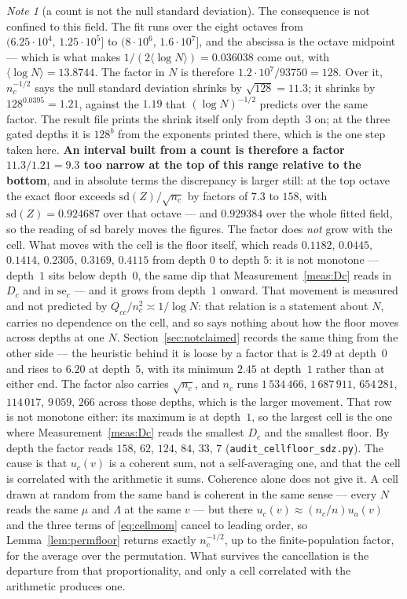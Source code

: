 \documentclass[11pt,a4paper]{article}
\theoremstyle{plain}
\theoremstyle{definition}
\theoremstyle{remark}
\newtheorem{note}[theorem]{Note}
\begin{document}
\begin{note}[a count is not the null standard deviation]\label{note:notanerrorbar}
The consequence is not confined to this field. The fit runs over the
eight octaves from $(6.25\cdot10^4,\,1.25\cdot10^5]$ to
$(8\cdot10^6,\,1.6\cdot10^7]$, and the abscissa is the octave midpoint
--- which is what makes $1/(2\langle\log N\rangle)=0.036038$ come out,
with $\langle\log N\rangle=13.8744$. The factor in $N$ is therefore
$1.2\cdot10^7/93750=128$. Over it, $n_c^{-1/2}$ says the null
standard deviation shrinks by $\sqrt{128}=11.3$; it shrinks by $128^{0.0395}=1.21$,
against the $1.19$ that $(\log N)^{-1/2}$ predicts over the same
factor. The result file prints the shrink itself only from depth~$3$
on; at the three gated depths it is $128^b$ from the exponents printed
there, which is the one step taken here. \textbf{An interval built from a count is therefore a factor
$11.3/1.21=9.3$ too narrow at the top of this range relative to the
bottom}, and in absolute terms the
discrepancy is larger still: at the top octave the exact floor exceeds
$\mathrm{sd}(Z)/\sqrt{n_c}$ by factors of $7.3$ to $158$, with
$\mathrm{sd}(Z)=0.924687$ over that octave --- and $0.929384$ over the
whole fitted field, so the reading of $\mathrm{sd}$ barely moves the
figures. The factor does \emph{not} grow with the cell. What moves with
the cell is the floor itself, which reads $0.1182$, $0.0445$, $0.1414$,
$0.2305$, $0.3169$, $0.4115$ from depth $0$ to depth $5$: it is not
monotone --- depth~$1$ sits below depth~$0$, the same dip that
Measurement~\ref{meas:Dc} reads in $D_c$ and in $\mathrm{se}_c$ --- and
it grows from depth~$1$ onward. That movement is measured and not
predicted by
$Q_{cc}/n_c^2\asymp1/\log N$: that relation is a statement about $N$,
carries no dependence on the cell, and so says nothing about how the
floor moves across depths at one $N$. Section~\ref{sec:notclaimed}
records the same thing from the other side --- the heuristic behind it
is loose by a factor that is $2.49$ at depth~$0$ and rises to $6.20$ at
depth~$5$, with its minimum $2.45$ at depth~$1$ rather than at either
end. The factor
also carries $\sqrt{n_c}$, and $n_c$ runs $1\,534\,466$,
$1\,687\,911$, $654\,281$, $114\,017$, $9\,059$, $266$ across those
depths, which is the larger movement. That row is not monotone either:
its maximum is at depth~$1$, so the largest cell is the one where
Measurement~\ref{meas:Dc} reads the smallest $D_c$ and the smallest
floor. By depth the
factor reads $158$, $62$, $124$, $84$, $33$, $7$
(\texttt{audit\_cellfloor\_sdz.py}). The cause
is that $u_c(v)$ is a coherent sum, not a self-averaging one, and that
the cell is correlated with the arithmetic it sums. Coherence alone
does not give it. A cell drawn at random from the same band is
coherent in the same sense --- every $N$ reads the same $\mu$ and
$\Lambda$ at the same $v$ --- but there $u_c(v)\approx(n_c/n)u_a(v)$
and the three terms of \eqref{eq:cellmom} cancel to leading order, so
Lemma~\ref{lem:permfloor} returns exactly $n_c^{-1/2}$, up to the
finite-population factor, for the average over the permutation. What survives the cancellation is the
departure from that proportionality, and only a cell correlated with
the arithmetic produces one.
\end{note}
\end{document}
